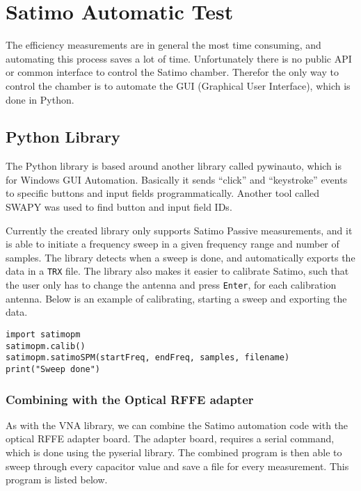 \section{Satimo Automatic Test}
\label{sec:satimo_python}
The efficiency measurements are in general the most time consuming, and automating this process saves a lot of time. Unfortunately there is no public API or common interface to control the Satimo chamber. Therefor the only way to control the chamber is to automate the GUI (Graphical User Interface), which is done in Python.

\subsection{Python Library}
The Python library is based around another library called pywinauto, which is for Windows GUI Automation. Basically it sends ``click'' and ``keystroke'' events to specific buttons and input fields programmatically. Another tool called SWAPY was used to find button and input field IDs. 

Currently the created library only supports Satimo Passive measurements, and it is able to initiate a frequency sweep in a given frequency range and number of samples. The library detects when a sweep is done, and automatically exports the data in a \verb|TRX| file. The library also makes it easier to calibrate Satimo, such that the user only has to change the antenna and press \verb|Enter|, for each calibration antenna. Below is an example of calibrating, starting a sweep and exporting the data.  

\begin{lstlisting}
import satimopm
satimopm.calib()
satimopm.satimoSPM(startFreq, endFreq, samples, filename)
print("Sweep done")
\end{lstlisting}
 
\subsubsection{Combining with the Optical RFFE adapter}
As with the VNA library, we can combine the Satimo automation code with the optical RFFE adapter board. The adapter board, requires a serial command, which is done using the pyserial library. The combined program is then able to sweep through every capacitor value and save a file for every measurement. This program is listed below. 

